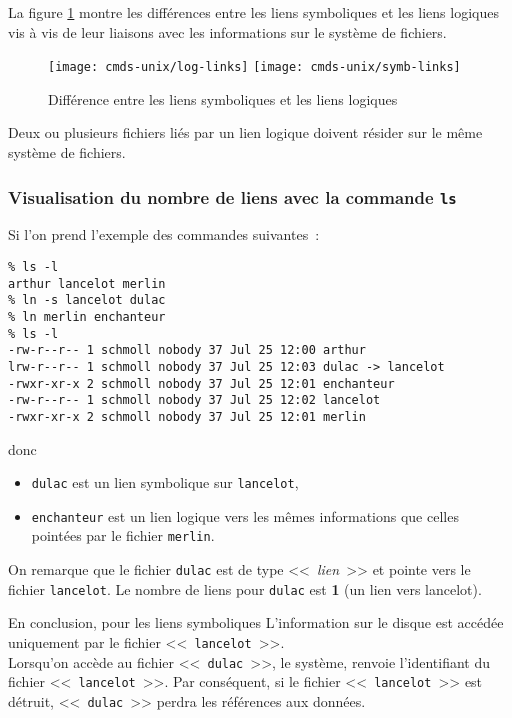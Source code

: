 La figure \ref{fig-cmds-links} montre les diff{\'e}rences entre les liens symboliques
et les liens logiques vis {\`a} vis de leur liaisons avec les informations sur
le syst{\`e}me de fichiers.

\begin{figure}[hbtp]
\centering
\texttt{[image: cmds-unix/log-links]}
\texttt{[image: cmds-unix/symb-links]}
\caption{\label{fig-cmds-links}Diff{\'e}rence entre les liens symboliques et les
liens logiques}
\end{figure}

\begin{remarque}
Deux ou plusieurs fichiers li{\'e}s par un lien logique doivent r{\'e}sider
sur le m{\^e}me syst{\`e}me de fichiers.
\end{remarque}

\subsubsection{Visualisation du nombre de liens avec la commande {\tt ls}}

\begin{example}
Si l'on prend l'exemple des commandes suivantes~:
\begin{verbatim}
% ls -l
arthur lancelot merlin
% ln -s lancelot dulac
% ln merlin enchanteur
% ls -l
-rw-r--r-- 1 schmoll nobody 37 Jul 25 12:00 arthur
lrw-r--r-- 1 schmoll nobody 37 Jul 25 12:03 dulac -> lancelot
-rwxr-xr-x 2 schmoll nobody 37 Jul 25 12:01 enchanteur
-rw-r--r-- 1 schmoll nobody 37 Jul 25 12:02 lancelot
-rwxr-xr-x 2 schmoll nobody 37 Jul 25 12:01 merlin
\end{verbatim}
donc
\begin{itemize}
	\item {\tt dulac} est un lien symbolique sur {\tt lancelot},
	\item {\tt enchanteur} est un lien logique vers les m{\^e}mes informations
			que celles point{\'e}es par le fichier {\tt merlin}.
\end{itemize}

On remarque que le fichier {\tt dulac} est de
type <<~{\sl lien}~>> et pointe vers le fichier {\tt lancelot}. Le
nombre de liens pour {\tt dulac} est {\bf 1} (un lien vers lancelot).
\end{example}

\begin{definition}{En conclusion, pour les liens symboliques}
L'information sur le disque est acc{\'e}d{\'e}e uniquement par le fichier
<<~{\tt lancelot}~>>. \\
Lorsqu'on acc{\`e}de au fichier <<~{\tt dulac}~>>, le syst{\`e}me,
renvoie l'identifiant du fichier  <<~{\tt lancelot}~>>. Par
cons{\'e}quent, si le fichier <<~{\tt lancelot}~>> est d{\'e}truit,
<<~{\tt dulac}~>> perdra les r{\'e}f{\'e}rences aux donn{\'e}es.
\end{definition}

